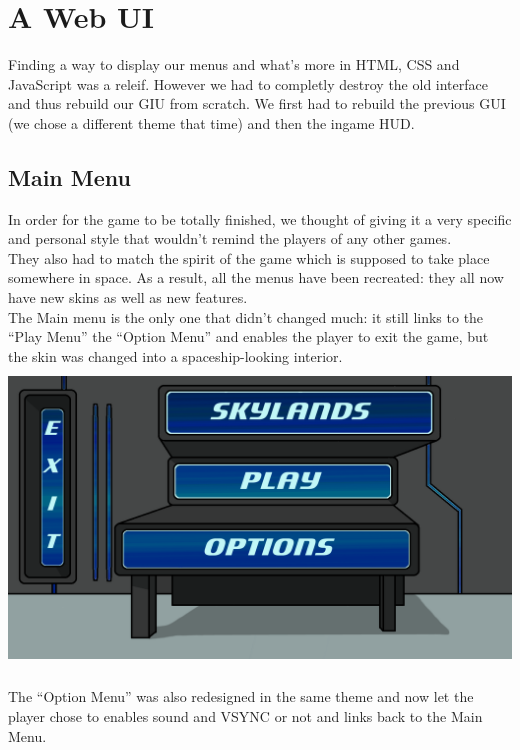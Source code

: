 \documentclass[article]{report}         %
\begin{document}
      \section{A Web UI}
        Finding a way to display our menus and what's more in HTML, CSS and JavaScript was a releif. However we had to completly destroy the old interface and thus rebuild our GIU from scratch. We first had to rebuild the previous GUI (we chose a different theme that time) and then the ingame HUD.

           \subsection{ Main Menu}

    In order for the game to be totally finished, we thought of giving it a very specific and personal style that wouldn't remind the players of any other games. \\

    They also had to match the spirit of the game which is supposed to take place somewhere in space. As a result, all the menus have been recreated: they all now have new skins as well as new features.  \\ 
 
    The Main menu is the only one that didn't changed much: it still links to the ``Play Menu'' the ``Option Menu'' and enables the player to exit the game, but the skin was changed into a spaceship-looking interior. \\

    \includegraphics[width=15cm, height=8cm]{images/Menus/Menu_Normal_view.png} 
    \newpage

    The ``Option Menu'' was also redesigned in the same theme and now let the player chose to enables sound and VSYNC or not and links back to the Main Menu. \\
\end{document}
